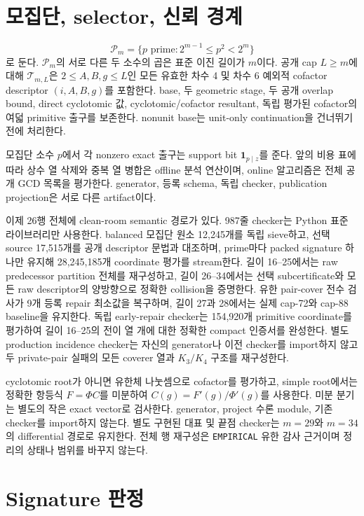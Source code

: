 \documentclass[11pt]{article}
\begin{document}
\section{모집단, selector, 신뢰 경계}

\[
\mathcal P_m=\{p\text{ prime}:2^{m-1}\le p^2<2^m\}
\]
로 둔다. \(\mathcal P_m\)의 서로 다른 두 소수의 곱은 표준 이진 길이가
\(m\)이다. 공개 cap \(L\ge m\)에 대해 \(\mathcal T_{m,L}\)은
\(2\le A,B,g\le L\)인 모든 유효한 차수 4 및 차수 6 예외적 cofactor
descriptor \((i,A,B,g)\)를 포함한다. base, 두 geometric stage, 두 공개
overlap bound, direct cyclotomic 값, cyclotomic/cofactor resultant,
독립 평가된 cofactor의 여덟 primitive 출구를 보존한다. nonunit base는
unit-only continuation을 건너뛰기 전에 처리한다.

모집단 소수 \(p\)에서 각 nonzero exact 출구는 support bit
\(\mathbf1_{p\mid z}\)를 준다. 앞의 비용 표에 따라 상수 열 삭제와 중복
열 병합은 offline 분석 연산이며, online 알고리즘은 전체 공개 GCD 목록을
평가한다. generator, 등록 schema, 독립 checker, publication projection은
서로 다른 artifact이다.

이제 26행 전체에 clean-room semantic 경로가 있다. 987줄 checker는
Python 표준 라이브러리만 사용한다. balanced 모집단 원소 12,245개를
독립 sieve하고, 선택 source 17,515개를 공개 descriptor 문법과
대조하며, prime마다 packed signature 하나만 유지해 28,245,185개
coordinate 평가를 stream한다. 길이 16--25에서는 raw predecessor
partition 전체를 재구성하고, 길이 26--34에서는 선택 subcertificate와
모든 raw descriptor의 양방향으로 정확한 collision을 증명한다. 유한
pair-cover 전수 검사가 9개 등록 repair 최소값을 복구하며, 길이 27과
28에서는 실제 cap-72와 cap-88 baseline을 유지한다.
독립 early-repair checker는 154,920개 primitive coordinate를 평가하여
길이 16--25의 전이 열 개에 대한 정확한 compact 인증서를 완성한다.
별도 production incidence checker는 자신의 generator나 이전 checker를
import하지 않고 두 private-pair 실패의 모든 coverer 열과 \(K_3/K_4\)
구조를 재구성한다.

cyclotomic root가 아니면 유한체 나눗셈으로 cofactor를 평가하고,
simple root에서는 정확한 항등식 \(F=\Phi C\)를 미분하여
\(C(g)=F'(g)/\Phi'(g)\)를 사용한다. 미분 분기는 별도의 작은 exact
vector로 검사한다. generator, project 수론 module, 기존 checker를
import하지 않는다. 별도 구현된 대표 및 끝점 checker는 \(m=29\)와
\(m=34\)의 differential 경로로 유지한다. 전체 행 재구성은
\texttt{EMPIRICAL} 유한 감사 근거이며 정리의 상태나 범위를 바꾸지 않는다.

\section{Signature 판정}
\end{document}
